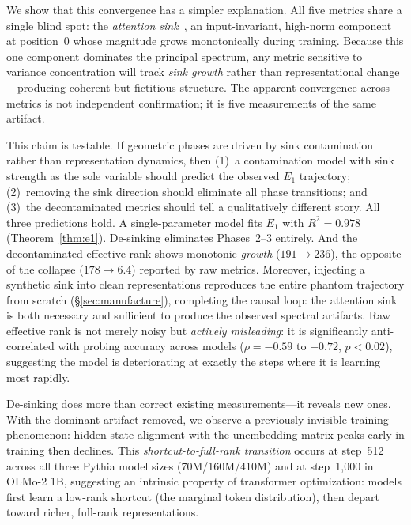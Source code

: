 \documentclass[11pt]{article}
\begin{document}
We show that this convergence has a simpler explanation.
All five metrics share a single blind spot: the \emph{attention sink}~\citep{xiao2024efficient}, an input-invariant, high-norm component at position~0 whose magnitude grows monotonically during training.
Because this one component dominates the principal spectrum, any metric sensitive to variance concentration will track \emph{sink growth} rather than representational change---producing coherent but fictitious structure.
The apparent convergence across metrics is not independent confirmation; it is five measurements of the same artifact.

This claim is testable.
If geometric phases are driven by sink contamination rather than representation dynamics, then (1)~a contamination model with sink strength as the sole variable should predict the observed $E_1$ trajectory; (2)~removing the sink direction should eliminate all phase transitions; and (3)~the decontaminated metrics should tell a qualitatively different story.
All three predictions hold.
A single-parameter model fits $E_1$ with $R^2 = 0.978$ (Theorem~\ref{thm:e1}).
De-sinking eliminates Phases~2--3 entirely.
And the decontaminated effective rank shows monotonic \emph{growth} ($191 \to 236$), the opposite of the collapse ($178 \to 6.4$) reported by raw metrics.
Moreover, injecting a synthetic sink into clean representations reproduces the entire phantom trajectory from scratch (\S\ref{sec:manufacture}), completing the causal loop: the attention sink is both necessary and sufficient to produce the observed spectral artifacts.
Raw effective rank is not merely noisy but \emph{actively misleading}: it is significantly anti-correlated with probing accuracy across models ($\rho = -0.59$ to $-0.72$, $p < 0.02$), suggesting the model is deteriorating at exactly the steps where it is learning most rapidly.

De-sinking does more than correct existing measurements---it reveals new ones.
With the dominant artifact removed, we observe a previously invisible training phenomenon: hidden-state alignment with the unembedding matrix peaks early in training then declines.
This \emph{shortcut-to-full-rank transition} occurs at step~512 across all three Pythia model sizes (70M/160M/410M) and at step~1{,}000 in OLMo-2 1B, suggesting an intrinsic property of transformer optimization: models first learn a low-rank shortcut (the marginal token distribution), then depart toward richer, full-rank representations.
\end{document}
